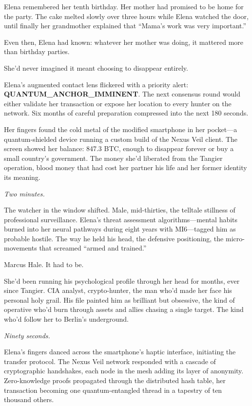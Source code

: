 Elena remembered her tenth birthday. Her mother had promised to be home for the party. The cake melted slowly over three hours while Elena watched the door, until finally her grandmother explained that ``Mama's work was very important.''

Even then, Elena had known: whatever her mother was doing, it mattered more than birthday parties.

She'd never imagined it meant choosing to disappear entirely.

Elena's augmented contact lens flickered with a priority alert: \textbf{QUANTUM\_ANCHOR\_IMMINENT}. The next consensus round would either validate her transaction or expose her location to every hunter on the network. Six months of careful preparation compressed into the next 180 seconds.

Her fingers found the cold metal of the modified smartphone in her pocket---a quantum-shielded device running a custom build of the Nexus Veil client. The screen showed her balance: 847.3 BTC, enough to disappear forever or buy a small country's government. The money she'd liberated from the Tangier operation, blood money that had cost her partner his life and her former identity its meaning.

\emph{Two minutes.}

The watcher in the window shifted. Male, mid-thirties, the telltale stillness of professional surveillance. Elena's threat assessment algorithms---mental habits burned into her neural pathways during eight years with MI6---tagged him as probable hostile. The way he held his head, the defensive positioning, the micro-movements that screamed ``armed and trained.''

Marcus Hale. It had to be.

She'd been running his psychological profile through her head for months, ever since Tangier. CIA analyst, crypto-hunter, the man who'd made her face his personal holy grail. His file painted him as brilliant but obsessive, the kind of operative who'd burn through assets and allies chasing a single target. The kind who'd follow her to Berlin's underground.

\emph{Ninety seconds.}

Elena's fingers danced across the smartphone's haptic interface, initiating the transfer protocol. The Nexus Veil network responded with a cascade of cryptographic handshakes, each node in the mesh adding its layer of anonymity. Zero-knowledge proofs propagated through the distributed hash table, her transaction becoming one quantum-entangled thread in a tapestry of ten thousand others.

